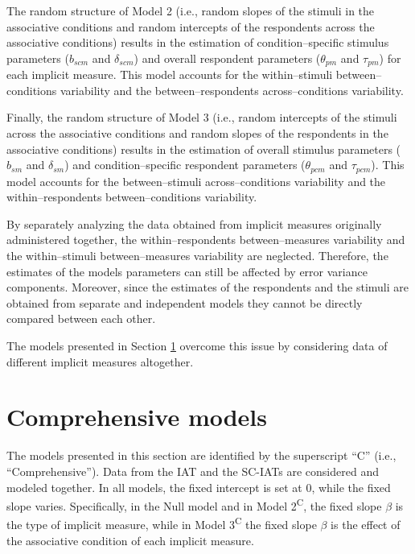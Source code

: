 \documentclass[12pt]{book}
\begin{document}
The random structure of Model 2 (i.e.,  random slopes of the stimuli in the associative conditions and random intercepts of the respondents across the associative conditions) results in the estimation of condition--specific stimulus parameters ($b_{scm}$ and $\delta_{scm}$) and overall respondent parameters ($\theta_{pm}$ and $\tau_{pm}$) for each implicit measure. 
This model accounts for the within--stimuli between--conditions variability and the between--respondents across--conditions variability.

Finally, the random structure of Model 3 (i.e., random intercepts of the stimuli across the associative conditions and  random slopes of the respondents in the associative conditions) results in the estimation of overall stimulus parameters ($b_{sm}$ and $\delta_{sm}$) and condition--specific respondent parameters ($\theta_{pcm}$ and $\tau_{pcm}$). 
This model accounts for the between--stimuli across--conditions variability and the within--respondents between--conditions variability. 

By separately analyzing the data obtained from implicit measures originally administered together, the within--respondents between--measures variability and the within--stimuli between--measures variability are neglected. 
Therefore, the estimates of the models parameters can still be affected by error variance components. 
Moreover, since the estimates of the respondents and the stimuli are obtained from separate and independent models they cannot be directly compared between each other.

The models presented in Section \ref{sec:modelType} overcome this issue by considering data of different implicit measures altogether. 

\section{Comprehensive models} \label{sec:modelType}

The models presented in this section are identified by the superscript ``C'' (i.e., ``Comprehensive'').
Data from the IAT and the SC-IATs are considered and modeled together. 
In all models, the fixed intercept is set at $0$, while the fixed slope varies. Specifically, in the Null model and in Model 2\textsuperscript{C}, the fixed slope $\beta$ is the type of implicit measure, while in Model 3\textsuperscript{C} the fixed slope $\beta$ is the effect of the associative condition of each implicit measure. 
\end{document}
